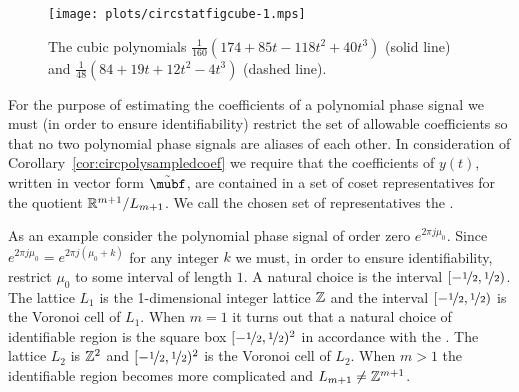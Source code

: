 \documentclass[journal]{IEEEtran}
\begin{document}

\begin{figure}[t]
	\centering
		\texttt{[image: plots/circstatfigcube-1.mps]}
		\caption{The cubic polynomials $\tfrac{1}{160} (174 + 85 t - 118 t^2 + 40 t^3)$ (solid line) and $\tfrac{1}{48} (84 + 19 t + 12 t^2 - 4 t^3)$  (dashed line).}
		\label{fig:circstatplot_cube}
\end{figure}

For the purpose of estimating the coefficients of a polynomial phase signal we must (in order to ensure identifiability) restrict the set of allowable coefficients so that no two polynomial phase signals are aliases of each other. In consideration of Corollary~\ref{cor:circpolysampledcoef} we require that the coefficients of $y(t)$, written in vector form $\tilde{\mubf}$, are contained in a set of coset representatives for the quotient ${\mathbb R}^{m+1}/L_{m+1}$.  We call the chosen set of representatives the .

As an example consider the polynomial phase signal of order zero $e^{2\pi j \mu_0}$.  Since $e^{2\pi j \mu_0} = e^{2\pi j(\mu_0 + k)}$ for any integer $k$ we must, in order to ensure identifiability, restrict $\mu_0$ to some interval of length $1$.  A natural choice is the interval $[-\nicefrac{1}{2}, \nicefrac{1}{2})$. The lattice $L_1$ is the 1-dimensional integer lattice ${\mathbb Z}$ and the interval $[-\nicefrac{1}{2}, \nicefrac{1}{2})$ is the Voronoi cell of $L_1$. 
When $m=1$ it turns out that a natural choice of identifiable region is the square box $[-\nicefrac{1}{2}, \nicefrac{1}{2})^2$ in accordance with the .  The lattice $L_2$ is ${\mathbb Z}^2$ and $[-\nicefrac{1}{2}, \nicefrac{1}{2})^2$ is the Voronoi cell of $L_2$.  
When $m > 1$ the identifiable region becomes more complicated and $L_{m+1} \neq {\mathbb Z}^{m+1}$. %
\end{document}
